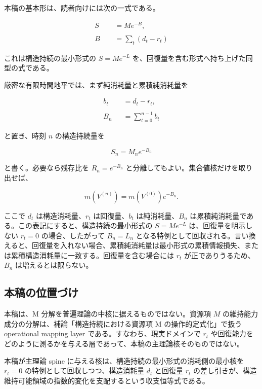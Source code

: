 \documentclass[12pt,a4paper]{article}
\begin{document}
本稿の基本形は、読者向けには次の一式である。

\[
\begin{aligned}
S &= M e^{-B}, \\
\qquad \\
B &= \sum_{t}(d_{t}-r_{t})
\end{aligned}
\]

これは構造持続の最小形式の \(S=Me^{-L}\) を、回復量を含む形式へ持ち上げた同型の式である。

厳密な有限時間地平では、まず純消耗量と累積純消耗量を

\[
\begin{aligned}
b_{t} &= d_{t} - r_{t}, \\
\qquad \\
B_{n} &= \sum_{t=0}^{n-1} b_{t}
\end{aligned}
\]

と置き、時刻 \(n\) の構造持続量を

\[
S_{n} = M_{n} e^{-B_{n}}
\]

と書く。必要なら残存比を \(R_{n}=e^{-B_{n}}\) と分離してもよい。集合値核だけを取り出せば、

\[
m(V^{(n)}) = m(V^{(0)}) e^{-B_{n}}.
\]

ここで \(d_{t}\) は構造消耗量、\(r_{t}\) は回復量、\(b_{t}\) は純消耗量、\(B_{n}\) は累積純消耗量である。この表記にすると、構造持続の最小形式の \(S=Me^{-L}\) は、回復量を明示しない \(r_{t}=0\) の場合、したがって \(B_{n}=L_{n}\) となる特例として回収される。言い換えると、回復量を入れない場合、累積純消耗量は最小形式の累積情報損失、または累積構造消耗量に一致する。回復量を含む場合には \(r_{t}\) が正でありうるため、\(B_{n}\) は増えるとは限らない。

\subsection{本稿の位置づけ}\label{ux672cux7a3fux306eux4f4dux7f6eux3065ux3051}

本稿は、M 分解を普遍理論の中核に据えるものではない。資源項 \(M\) の維持能力成分の分解は、補論「構造持続における資源項 M の操作的定式化」で扱う operational mapping layer である。すなわち、現実ドメインで \(r_{t}\) や回復能力をどのように測るかを与える層であって、本稿の主理論核そのものではない。

本稿が主理論 spine に与える核は、構造持続の最小形式の消耗側の最小核を \(r_{t}=0\) の特例として回収しつつ、構造消耗量 \(d_{t}\) と回復量 \(r_{t}\) の差し引きが、構造維持可能領域の指数的変化を支配するという収支恒等式である。
\end{document}
